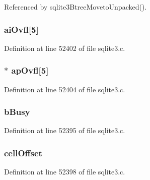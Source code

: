 Referenced by sqlite3\+Btree\+Moveto\+Unpacked().

\hypertarget{struct_mem_page_a387d18f12379bccb6e2d1b9842a5c3ff}{}
\subsubsection[{ai\+Ovfl}]{ ai\+Ovfl\mbox{[}5\mbox{]}}\label{struct_mem_page_a387d18f12379bccb6e2d1b9842a5c3ff}


Definition at line 52402 of file sqlite3.\+c.

\hypertarget{struct_mem_page_a1a39c11853c230782c10dc115064a62a}{}
\subsubsection[{ap\+Ovfl}]{$\ast$ ap\+Ovfl\mbox{[}5\mbox{]}}\label{struct_mem_page_a1a39c11853c230782c10dc115064a62a}


Definition at line 52404 of file sqlite3.\+c.

\hypertarget{struct_mem_page_a8eaec6ef6a9a6fbeb51396cae4427567}{}
\subsubsection[{b\+Busy}]{ b\+Busy}\label{struct_mem_page_a8eaec6ef6a9a6fbeb51396cae4427567}


Definition at line 52395 of file sqlite3.\+c.

\hypertarget{struct_mem_page_adda6243a1481abb2611fdf378cccb161}{}
\subsubsection[{cell\+Offset}]{ cell\+Offset}\label{struct_mem_page_adda6243a1481abb2611fdf378cccb161}


Definition at line 52398 of file sqlite3.\+c.

\hypertarget{struct_mem_page_aaa3442066b65e5022cc4aeb3e03e62ea}{}
